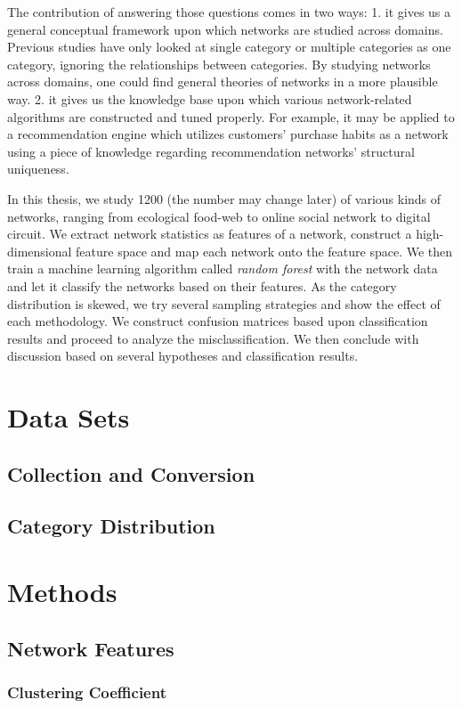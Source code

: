 \documentclass{article}
\begin{document}
The contribution of answering those questions comes in two ways: 1. it gives us a general conceptual framework upon which networks are studied across domains. Previous studies have only looked at single category or multiple categories as one category, ignoring the relationships between categories. By studying networks across domains, one could find general theories of networks in a more plausible way. 2. it gives us the knowledge base upon which various network-related algorithms are constructed and tuned properly.  For example, it may be applied to a recommendation engine which utilizes customers' purchase habits as a network using a piece of knowledge regarding recommendation networks' structural uniqueness.

In this thesis, we study 1200 (the number may change later) of various kinds of networks, ranging from ecological food-web to online social network to digital circuit. We extract network statistics as features of a network, construct a high-dimensional feature space and map each network onto the feature space. We then train a machine learning algorithm called \textit{random forest} with the network data and let it classify the networks based on their features. As the category distribution is skewed, we try several sampling strategies and show the effect of each methodology. We construct confusion matrices based upon classification results and proceed to analyze the misclassification. We then conclude with discussion based on several hypotheses and classification results.

\section{Data Sets}
	\subsection{Collection and Conversion}
	\subsection{Category Distribution}

\section{Methods}
	\subsection{Network Features}
		\subsubsection{Clustering Coefficient}
\end{document}
